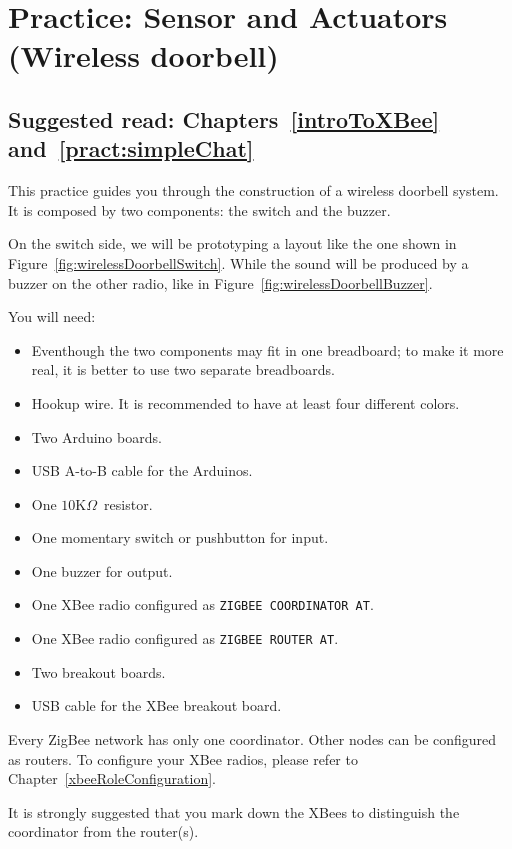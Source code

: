 \chapter{Practice: Sensor and Actuators (Wireless doorbell)}\label{pract:wirelessDoorbell}
\section*{Suggested read: Chapters~\ref{introToXBee} and~\ref{pract:simpleChat}}

This practice guides you through the construction of a wireless doorbell system. It is composed by two components: the switch and the buzzer.

On the switch side, we will be prototyping a layout like the one shown in Figure~\ref{fig:wirelessDoorbellSwitch}. While the sound will be produced by a buzzer on the other radio, like in Figure~\ref{fig:wirelessDoorbellBuzzer}.

You will need:

\begin{itemize}
  \item Eventhough the two components may fit in one breadboard; to make it more real, it is better to use two separate breadboards.
  \item Hookup wire. It is recommended to have at least four different colors.
  \item Two Arduino boards.
  \item USB A-to-B cable for the Arduinos.
  \item One $10$K$\Omega$~resistor.
  \item One momentary switch or pushbutton for input.
  \item One buzzer for output.
  \item One XBee radio configured as \texttt{ZIGBEE COORDINATOR AT}.
  \item One XBee radio configured as \texttt{ZIGBEE ROUTER AT}.
  \item Two breakout boards.
  \item USB cable for the XBee breakout board.
\end{itemize}

Every ZigBee network has only one coordinator. Other nodes can be configured as routers. To configure your XBee radios, please refer to Chapter~\ref{xbeeRoleConfiguration}.

It is strongly suggested that you mark down the XBees to distinguish the coordinator from the router(s).

